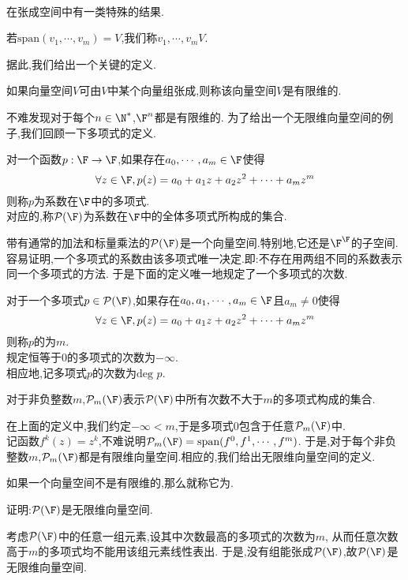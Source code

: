 \documentclass{ctexart}
\begin{document}
\\
在张成空间中有一类特殊的结果.
\begin{definition}[2.1 定义:张成]
    若$\text{span}(v_1,\cdots,v_m)=V$,我们称$v_1,\cdots,v_m$$V$.
\end{definition}\noindent
据此,我们给出一个关键的定义.
\begin{definition}[2.2 定义:有限维向量空间]
    如果向量空间$V$可由$V$中某个向量组张成,则称该向量空间$V$是有限维的.
\end{definition}\noindent
不难发现对于每个$n\in\N^*$,$\F^n$都是有限维的.
为了给出一个无限维向量空间的例子,我们回顾一下多项式的定义.
\begin{definition}
    对一个函数$p:\F\to\F$,如果存在$a_0,\cdots,a_m\in\F$使得
    $$\forall z\in\F,p(z)=a_0+a_1z+a_2z^2+\cdots+a_mz^m$$
    则称$p$为系数在$\F$中的多项式.\\
    对应的,称$\mathcal{P}(\F)$为系数在$\F$中的全体多项式所构成的集合.
\end{definition}\noindent
带有通常的加法和标量乘法的$\mathcal{P}(\F)$是一个向量空间.特别地,它还是$\F^\F$的子空间.\\
容易证明,一个多项式的系数由该多项式唯一决定.即:不存在用两组不同的系数表示同一个多项式的方法.
于是下面的定义唯一地规定了一个多项式的次数.
\begin{definition}
    对于一个多项式$p\in\mathcal{P}(\F)$,如果存在$a_0,a_1,\cdots,a_m\in\F$且$a_m\neq0$使得
    $$\forall z\in\F,p(z)=a_0+a_1z+a_2z^2+\cdots+a_mz^m$$
    则称$p$的为$m$.\\
    规定恒等于$0$的多项式的次数为$-\infty$.\\
    相应地,记多项式$p$的次数为$\text{deg }p$.
\end{definition}
\begin{definition}[2.5 记号:$\mathcal{P}_m(\F)$]
    对于非负整数$m$,$\mathcal{P}_m(\F)$表示$\mathcal{P}(\F)$中所有次数不大于$m$的多项式构成的集合.
\end{definition}\noindent
在上面的定义中,我们约定$-\infty<m$,于是多项式$0$包含于任意$\mathcal{P}_m(\F)$中.\\
记函数$f^k(z)=z^k$,不难说明$\mathcal{P}_m(\F)=\text{span}(f^0,f^1,\cdots,f^m)$.
于是,对于每个非负整数$m$,$\mathcal{P}_m(\F)$都是有限维向量空间.相应的,我们给出无限维向量空间的定义.
\begin{definition}[2.6 定义:无限维向量空间]
    如果一个向量空间不是有限维的,那么就称它为.
\end{definition}\noindent
\begin{problem}[2.7 例]
    证明:$\mathcal{P}(\F)$是无限维向量空间.
\end{problem}
\begin{solution}[Proof.]
    考虑$\mathcal{P}(\F)$中的任意一组元素,设其中次数最高的多项式的次数为$m$,
    从而任意次数高于$m$的多项式均不能用该组元素线性表出.
    于是,没有组能张成$\mathcal{P}(\F)$,故$\mathcal{P}(\F)$是无限维向量空间.
\end{solution}
\end{document}
